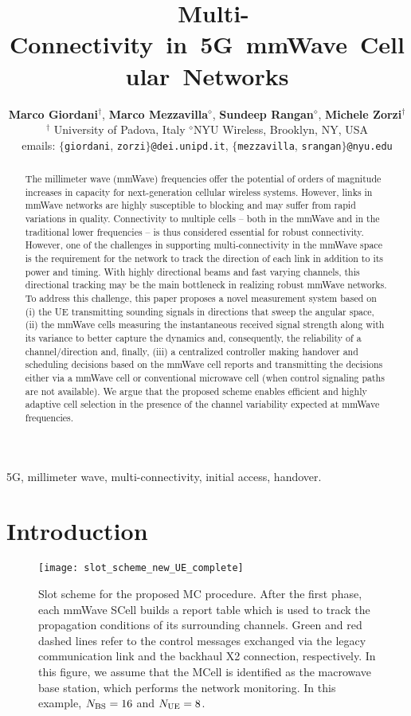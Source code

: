 \documentclass[conference,a4paper]{IEEEtran}
\title{\mbox{ \hspace{-0.3899 cm}Multi-Connectivity \hspace{-0.4 cm} in  \hspace{-0.4 cm} 5G  \hspace{-0.4 cm} mmWave  \hspace{-0.4 cm} Cellular  \hspace{-0.4 cm} Networks}}
\author{{{\bf Marco Giordani}$^\dagger$, {\bf Marco Mezzavilla}$^\diamond$, {\bf Sundeep Rangan}$^\diamond$, {\bf Michele Zorzi}$^\dagger$ }\\
$^\dagger$ University of Padova, Italy \quad $^\diamond$NYU Wireless, Brooklyn, NY, USA \\
emails: \small{$\{$\texttt{giordani}, \texttt{zorzi}$\}$\texttt{@dei.unipd.it}, $\{$\texttt{mezzavilla}, \texttt{srangan}$\}$\texttt{@nyu.edu}
}}
\begin{document}
\maketitle

\begin{abstract}  The millimeter wave (mmWave) frequencies offer the potential of orders of magnitude
increases in capacity for next-generation cellular wireless systems.  However, links in mmWave networks are highly
susceptible to blocking and may suffer from rapid variations in quality.
Connectivity to multiple cells -- both in the mmWave and  in the traditional lower frequencies -- is thus considered
essential for robust connectivity. However, one of the challenges in supporting multi-connectivity in the mmWave
space is the requirement for the network  to track the direction of each link in addition to its
power and timing.  With highly directional beams and fast varying channels, this directional tracking
may be the main bottleneck in realizing robust mmWave networks.
To address this challenge, this paper
proposes a novel measurement system based on (i) the UE transmitting sounding signals in
directions that sweep the angular space, (ii) the
mmWave cells measuring the instantaneous received signal strength along with its variance to better capture the dynamics and, consequently, the reliability of a channel/direction and, finally, 
(iii) a centralized controller making handover and scheduling decisions based on the mmWave cell
reports and  transmitting the decisions either via a mmWave cell or conventional microwave cell (when control signaling paths are not available).  
We argue that the proposed scheme enables efficient and highly adaptive 
cell selection in the presence of the channel variability  expected at mmWave frequencies.
\end{abstract}

\begin{IEEEkeywords}
5G, millimeter wave, multi-connectivity, initial access, handover.
\end{IEEEkeywords}

\section{Introduction}

\begin{figure*}[t!]
\centering
 \texttt{[image: slot\_scheme\_new\_UE\_complete]}
 \caption{Slot scheme for the proposed MC procedure. After the first phase, each mmWave SCell builds a report table which is used to track the propagation conditions of its surrounding channels. Green and red dashed lines refer to the control messages exchanged  via the legacy communication link and the backhaul X2  connection, respectively. In this figure, we assume that the MCell is identified as the macrowave base station, which performs the network monitoring. In this example, $N_{\rm BS} = 16$ and $N_{\rm UE} = 8$.}
 \label{fig:slot_scheme}
\end{figure*}
\end{document}
